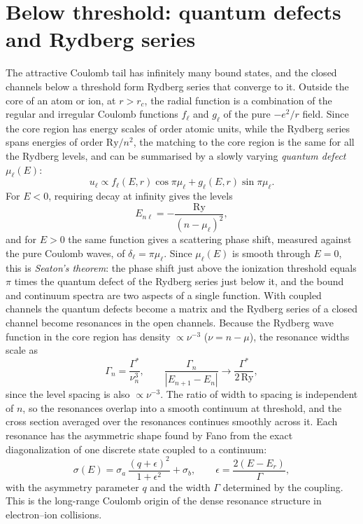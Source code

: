 \documentclass[11pt,a4paper]{book}
\numberwithin{equation}{chapter}
\begin{document}
\section{Below threshold: quantum defects and Rydberg series}\label{sec:qdt}

The attractive Coulomb tail has infinitely many bound states, and the closed
channels below a threshold form Rydberg series that converge to it. Outside the
core of an atom or ion, at $r>r_c$, the radial function is a combination of the
regular and irregular Coulomb functions $f_\ell$ and $g_\ell$ of the pure
$-e^2/r$ field. Since the core region has energy scales of order atomic units,
while the Rydberg series spans energies of order $\mathrm{Ry}/n^2$, the
matching to the core region is the same for all the Rydberg levels, and can be
summarised by a slowly varying \emph{quantum defect} $\mu_\ell(E)$:
\begin{equation}\label{eq:qdt}
  u_\ell\propto f_\ell(E,r)\cos\pi\mu_\ell+g_\ell(E,r)\sin\pi\mu_\ell .
\end{equation}
For $E<0$, requiring decay at infinity gives the levels
\begin{equation}\label{eq:qd-levels}
  E_{n\ell}=-\frac{\mathrm{Ry}}{(n-\mu_\ell)^2},
\end{equation}
and for $E>0$ the same function gives a scattering phase shift, measured against
the pure Coulomb waves, of $\delta_\ell=\pi\mu_\ell$. Since $\mu_\ell(E)$ is smooth
through $E=0$, this is \emph{Seaton's theorem}: the phase shift just above the
ionization threshold equals $\pi$ times the quantum defect of the Rydberg series
just below it, and the bound and continuum spectra are two aspects of a single
function. With coupled channels the quantum defects become a matrix and the
Rydberg series of a closed channel become resonances in the open channels.
Because the Rydberg wave function in the core region has density $\propto\nu^{-3}$
($\nu=n-\mu$), the resonance widths scale as
\begin{equation}\label{eq:gamma-nu3}
  \Gamma_n=\frac{\Gamma^*}{\nu_n^3},\qquad
  \frac{\Gamma_n}{|E_{n+1}-E_n|}\to\frac{\Gamma^*}{2\,\mathrm{Ry}},
\end{equation}
since the level spacing is also $\propto\nu^{-3}$. The ratio of width to spacing
is independent of $n$, so the resonances overlap into a smooth continuum at
threshold, and the cross section averaged over the resonances continues smoothly
across it. Each resonance has the asymmetric shape found by Fano from the exact
diagonalization of one discrete state coupled to a continuum:
\begin{equation}\label{eq:fano}
  \sigma(E)=\sigma_a\,\frac{(q+\epsilon)^2}{1+\epsilon^2}+\sigma_b,\qquad
  \epsilon=\frac{2(E-E_r)}{\Gamma},
\end{equation}
with the asymmetry parameter $q$ and the width $\Gamma$ determined by the
coupling. This is the long-range Coulomb origin of the dense resonance
structure in electron--ion collisions.
\end{document}
